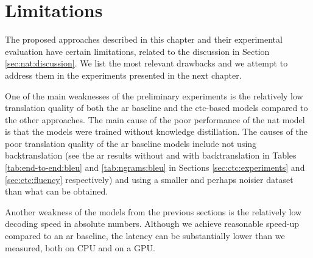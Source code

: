 \section{Limitations}
\label{sec:ctc:limitations}

The proposed approaches described in this chapter and their experimental
evaluation have certain limitations, related to the discussion in Section
\ref{sec:nat:discussion}. We list the most relevant drawbacks and we attempt to
address them in the experiments presented in the next chapter.

One of the main weaknesses of the preliminary experiments is the relatively low
translation quality of both the \acl{ar} baseline and the \acs{ctc}-based
models compared to the other approaches. The main cause of the poor performance
of the \ac{nat} model is that the models were trained without knowledge
distillation. The causes of the poor translation quality of the \ac{ar}
baseline models include not using backtranslation (see the \ac{ar} results
without and with backtranslation in Tables \ref{tab:end-to-end:bleu} and
\ref{tab:ngrams:bleu} in Sections \ref{sec:ctc:experiments} and
\ref{sec:ctc:fluency} respectively) and using a smaller and perhaps noisier
dataset than what can be obtained.

Another weakness of the models from the previous sections is the relatively low
decoding speed in absolute numbers. Although we achieve reasonable speed-up
compared to an \ac{ar} baseline, the latency can be substantially lower than we
measured, both on CPU and on a GPU.




